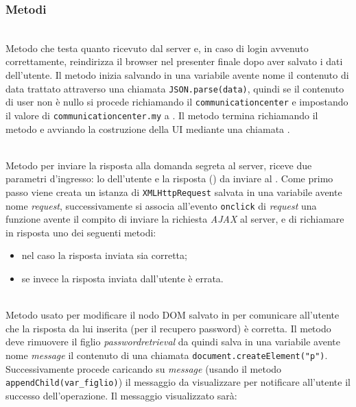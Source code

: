 \subsubsection*{Metodi}
\begin{description}

	\item{}\\
Metodo che testa quanto ricevuto dal server e, in caso di login avvenuto correttamente, reindirizza il browser nel presenter finale dopo aver salvato i dati dell'utente. Il metodo inizia salvando in una variabile avente nome  il contenuto di data trattato attraverso una chiamata \texttt{JSON.parse(data)}, quindi se il contenuto di user non è nullo si procede richiamando il \texttt{communicationcenter} e impostando il valore di \texttt{communicationcenter.my} a . Il metodo termina richiamando il metodo  e avviando la costruzione della UI mediante una chiamata .
	
	\item{}\\
	Metodo per inviare la risposta alla domanda segreta al server, riceve due parametri d'ingresso: lo  dell'utente e la risposta () da inviare al . Come primo passo viene creata un istanza di \texttt{XMLHttpRequest} salvata in una variabile avente nome \textit{request}, successivamente si associa all'evento \texttt{onclick} di \textit{request} una funzione avente il compito di inviare la richiesta \textit{AJAX} al server, e di richiamare in risposta uno dei seguenti metodi:
	\begin{itemize}
		\item {} nel caso la risposta inviata sia corretta;
		\item {} se invece la risposta inviata dall'utente è errata.
	\end{itemize}
	
	\item{}\\
	Metodo usato per modificare il nodo DOM salvato in  per comunicare all'utente che la risposta da lui inserita (per il recupero password) è corretta. 
Il metodo deve rimuovere il figlio \textit{passwordretrieval} da  quindi salva in una variabile avente nome \textit{message} il contenuto di una chiamata \verb|document.createElement("p")|. 
Successivamente procede caricando su \textit{message} (usando il metodo \texttt{appendChild(var\_figlio)}) il messaggio da visualizzare per notificare all'utente il successo dell'operazione. Il messaggio visualizzato sarà: \\
	

\end{description}
